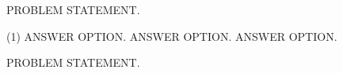 \documentclass[test, recordsfile={records.lua}]{practice}
\begin{document}
\null

\begin{question}
PROBLEM STATEMENT.
\begin{tasks}(1)
  \task ANSWER OPTION.
  \task ANSWER OPTION.
  \task ANSWER OPTION.
\end{tasks}
\end{question}

\begin{question}
PROBLEM STATEMENT.
\end{question}
\end{document}
